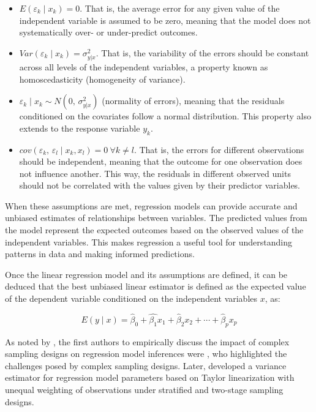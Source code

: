\documentclass[
  12pt,
]{book}
\begin{document}
\begin{itemize}
\item
  \(E\left(\varepsilon_{k}\mid x_{k}\right) = 0\). That is, the average error for any given value of the independent variable is assumed to be zero, meaning that the model does not systematically over- or under-predict outcomes.
\item
  \(Var\left(\varepsilon_{k}\mid x_{k}\right)=\sigma_{y|x}^{2}\). That is, the variability of the errors should be constant across all levels of the independent variables, a property known as homoscedasticity (homogeneity of variance).
\item
  \(\varepsilon_{k}\mid x_{k}\sim N\left(0,\,\sigma_{y|x}^{2}\right)\) (normality of errors), meaning that the residuals conditioned on the covariates follow a normal distribution. This property also extends to the response variable \(y_{k}\).
\item
  \(cov\left(\varepsilon_{k},\,\varepsilon_{l}\mid x_{k},x_{l}\right) = 0 \ \forall k \neq l\). That is, the errors for different observations should be independent, meaning that the outcome for one observation does not influence another. This way, the residuals in different observed units should not be correlated with the values given by their predictor variables.
\end{itemize}

When these assumptions are met, regression models can provide accurate and unbiased estimates of relationships between variables. The predicted values from the model represent the expected outcomes based on the observed values of the independent variables. This makes regression a useful tool for understanding patterns in data and making informed predictions.

Once the linear regression model and its assumptions are defined, it can be deduced that the best unbiased linear estimator is defined as the expected value of the dependent variable conditioned on the independent variables \(x\), as:

\[
E\left( y \mid x \right) = \hat{\beta}_{0} + \hat{\beta_{1}} x_{1} + \hat{\beta}_{2} x_{2} + \cdots + \hat{\beta}_{p} x_{p}
\]

As noted by \citet{Heeringa_West_Berglund_2017}, the first authors to empirically discuss the impact of complex sampling designs on regression model inferences were \citet{kish1974inference}, who highlighted the challenges posed by complex sampling designs. Later, \citet{fuller1975regression} developed a variance estimator for regression model parameters based on Taylor linearization with unequal weighting of observations under stratified and two-stage sampling designs.
\end{document}
